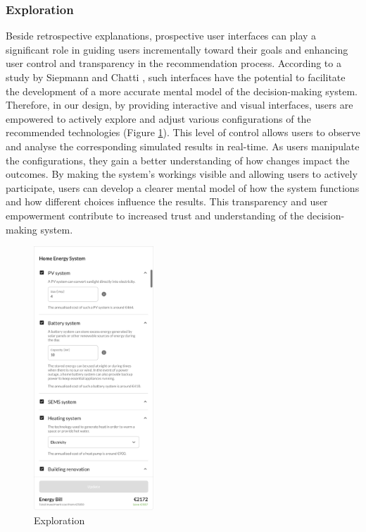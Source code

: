 \subsubsection{Exploration}

Beside retrospective explanations, prospective user interfaces can play a significant role in guiding users incrementally toward their goals and enhancing user control and transparency in the recommendation process. 
According to a study by Siepmann and Chatti \cite{Siepmann2023}, such interfaces have the potential to facilitate the development of a more accurate mental model of the decision-making system.
Therefore, in our design, by providing interactive and visual interfaces, users are empowered to actively explore and adjust various configurations of the recommended technologies (Figure \ref{fig:exploration}). 
This level of control allows users to observe and analyse the corresponding simulated results in real-time. 
As users manipulate the configurations, they gain a better understanding of how changes impact the outcomes. 
By making the system's workings visible and allowing users to actively participate, users can develop a clearer mental model of how the system functions and how different choices influence the results. 
This transparency and user empowerment contribute to increased trust and understanding of the decision-making system.
\begin{figure}[h]
  \centering
  \includegraphics[width=0.4\textwidth]{Images/exploration.png}
  \caption{Exploration}
  \label{fig:exploration}
\end{figure}

